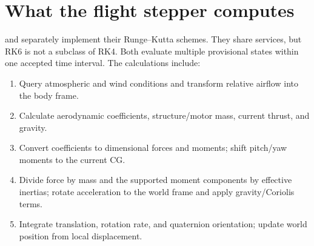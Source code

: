 
\section{What the flight stepper computes}
 and  separately implement their Runge--Kutta schemes. They share  services, but RK6 is not a subclass of RK4. Both evaluate multiple provisional states within one accepted time interval. The calculations include:
\begin{enumerate}
\item Query atmospheric and wind conditions and transform relative airflow into the body frame.
\item Calculate aerodynamic coefficients, structure/motor mass, current thrust, and gravity.
\item Convert coefficients to dimensional forces and moments; shift pitch/yaw moments to the current CG.
\item Divide force by mass and the supported moment components by effective inertias; rotate acceleration to the world frame and apply gravity/Coriolis terms.
\item Integrate translation, rotation rate, and quaternion orientation; update world position from local displacement.
\end{enumerate}

